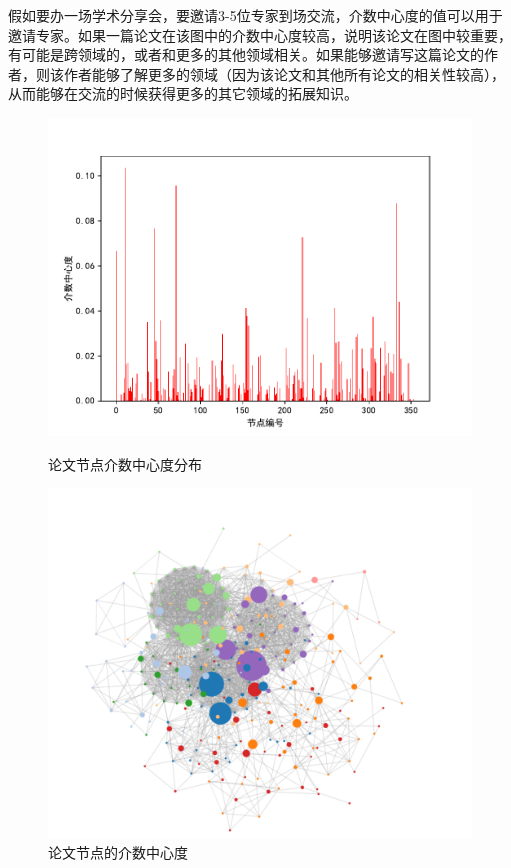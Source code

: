 \documentclass[UTF8, onecolumn, a4paper]{article}
\begin{document}
    假如要办一场学术分享会，要邀请3-5位专家到场交流，介数中心度的值可以用于邀请专家。如果一篇论文在该图中的介数中心度较高，说明该论文在图中较重要，有可能是跨领域的，或者和更多的其他领域相关。如果能够邀请写这篇论文的作者，则该作者能够了解更多的领域（因为该论文和其他所有论文的相关性较高），从而能够在交流的时候获得更多的其它领域的拓展知识。
\begin{center}
	\begin{figure}[ht] %
		\centering %
		\begin{minipage}[b]{0.95\linewidth} %
			\begin{minipage}[b]{0.47\linewidth} %
				\centering
				\includegraphics[width=\linewidth]{../pictures/paper_betweeness}
				\caption{论文节点介数中心度分布}
			\end{minipage}
			\hfill
			\begin{minipage}[b]{0.47\linewidth}
				\centering
				\includegraphics[width=\linewidth]{../pictures/show19}
				\caption{论文节点的介数中心度}
			\end{minipage}
		\end{minipage}
	\end{figure}
\end{center}
\end{document}
